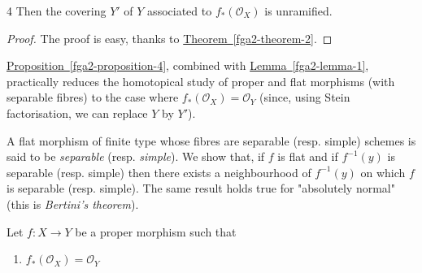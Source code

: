\begin{proposition}{4}
    Then the covering \(Y'\) of \(Y\) associated to \(f_*(\mathcal {O}_X)\) is unramified.\begin{proof}\par{}The proof is easy, thanks to \hyperref[fga2-theorem-2]{Theorem~\ref*{fga2-theorem-2}}.\end{proof}\end{proposition}\par{}\hyperref[fga2-proposition-4]{Proposition~\ref*{fga2-proposition-4}}, combined with \hyperref[fga2-lemma-1]{Lemma~\ref*{fga2-lemma-1}}, practically reduces the homotopical study of proper and flat morphisms (with separable fibres) to the case where \(f_*(\mathcal {O}_X)=\mathcal {O}_Y\) (since, using Stein factorisation, we can replace \(Y\) by \(Y'\)).\begin{remark}{}\label{fga2-8-remark}\skipsinglepar\par{}A flat morphism of finite type whose fibres are separable (resp. simple) schemes is said to be \emph{separable} (resp. \emph{simple}).
    We show that, if \(f\) is flat and if \(f^{-1}(y)\) is separable (resp. simple) then there exists a neighbourhood of \(f^{-1}(y)\) on which \(f\) is separable (resp. simple).
    The same result holds true for "absolutely normal" (this is \emph{Bertini's theorem}).\end{remark}\par{}Let \(f\colon  X\to  Y\) be a proper morphism such that

  
 \begin{enumerate}
    
 \item[i.]
      \(f_*(\mathcal {O}_X) = \mathcal {O}_Y\)
    

  \end{enumerate}

